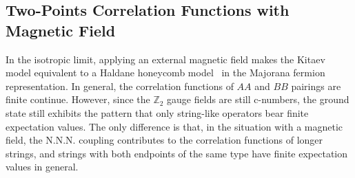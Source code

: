 \documentclass[12font]{article}
\theoremstyle{definition}
\newcommand{\alert}[1]{{\color{red}#1}}
\begin{document}
\subsection{Two-Points Correlation Functions with Magnetic Field}
In the isotropic limit, applying an external magnetic field makes the Kitaev model equivalent to a Haldane honeycomb model~\cite{Haldane_1988} in the Majorana fermion representation. In general, the correlation functions of $AA$ and $BB$ pairings are finite \alert{continue}. However, since the $\mathbb{Z}_2$ gauge fields are still c-numbers, the ground state still exhibits the pattern that only string-like operators bear finite expectation values. The only difference is that, in the situation with a magnetic field, the N.N.N. coupling contributes to the correlation functions of longer strings, and strings with both endpoints of the same type have finite expectation values in general. 
\end{document}
